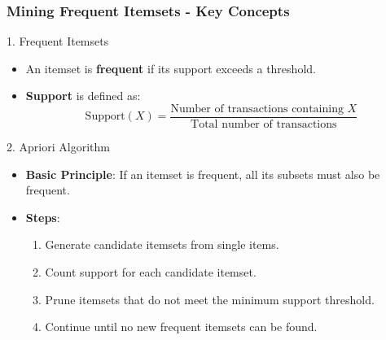 \documentclass[aspectratio=169]{beamer}
\begin{document}
\begin{frame}[fragile]
    \frametitle{Mining Frequent Itemsets - Key Concepts}
    \begin{block}{1. Frequent Itemsets}
        \begin{itemize}
            \item An itemset is \textbf{frequent} if its support exceeds a threshold.
            \item \textbf{Support} is defined as:
            \begin{equation}
            \text{Support}(X) = \frac{\text{Number of transactions containing } X}{\text{Total number of transactions}}
            \end{equation}
        \end{itemize}
    \end{block}
    
    \begin{block}{2. Apriori Algorithm}
        \begin{itemize}
            \item \textbf{Basic Principle}: If an itemset is frequent, all its subsets must also be frequent.
            \item \textbf{Steps}:
            \begin{enumerate}
                \item Generate candidate itemsets from single items.
                \item Count support for each candidate itemset.
                \item Prune itemsets that do not meet the minimum support threshold.
                \item Continue until no new frequent itemsets can be found.
            \end{enumerate}
        \end{itemize}
    \end{block}
\end{frame}
\end{document}
